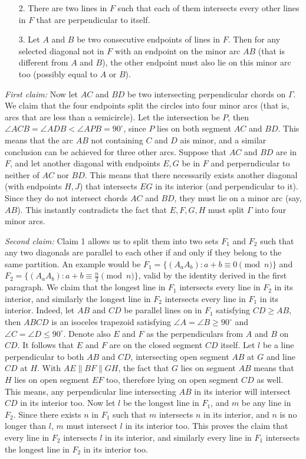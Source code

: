 \documentclass[11pt,a4paper]{article}
\begin{document}
\begin{itemize}
\begin{itemize}
\item [2.]
There are two lines in $F$ such that each of them intersects every other lines in $F$ that are perpendicular to itself.

\item [3.]
Let $A$ and $B$ be two consecutive endpoints of lines in $F$. 
Then for any selected diagonal not in $F$ with an endpoint on the minor arc $AB$ (that is different from $A$ and $B$), the other endpoint must also lie on this minor arc too (possibly equal to $A$ or $B$).

\end{itemize}
\emph{First claim:}
Now let $AC$ and $BD$ be two intersecting perpendicular chords on $\Gamma$. We claim that the four endpoints split the circles into four minor arcs (that is, arcs that are less than a semicircle). 
Let the intersection be $P$, then $\angle ACB=\angle ADB<\angle APB=90^{\circ}$, since $P$ lies on both segment $AC$ and $BD$. 
This means that the arc $AB$ not containing $C$ and $D$ ais minor, and a similar conclusion can be achieved for three other arcs. 
Suppose that $AC$ and $BD$ are in $F$, and let another diagonal with endpoints $E, G$ be in $F$ and perperndicular to neither of $AC$ nor $BD$. 
This means that there necessarily exists another diagonal (with endpoints $H, J$) that intersects $EG$ in its interior (and perpendicular to it). 
Since they do not intersect chords $AC$ and $BD$, they must lie on a minor arc (say, $AB$). 
This instantly contradicts the fact that $E, F, G, H$ must split $\Gamma$ into four minor arcs. 

\emph{Second claim:}
Claim 1 allows us to split them into two sets $F_1$ and $F_2$ such that any two diagonals are parallel to each other if and only if they belong to the same partition. 
An example would be $F_1=\{(A_aA_b): a+b\equiv 0\pmod{n}\}$ and $F_2=\{(A_aA_b): a+b\equiv \frac n2\pmod{n}\}$, 
valid by the identity derived in the first paragraph. 
We claim that the longest line in $F_1$ intersects every line in $F_2$ in its interior, and similarly the longest line in $F_2$ intersects every line in $F_1$ in its interior. 
Indeed, let $AB$ and $CD$ be parallel lines on in $F_1$ satisfying $CD\ge AB$, 
then $ABCD$ is an isoceles trapezoid satisfying $\angle A=\angle B\ge 90^{\circ}$ and $\angle C=\angle D\le 90^{\circ}$. 
Denote also $E$ and $F$ as the perpendiculars from $A$ and $B$ on $CD$. It follows that $E$ and $F$ are on the closed segment $CD$ itself. 
Let $l$ be a line perpendicular to both $AB$ and $CD$, intersecting open segment $AB$ at $G$ and line $CD$ at $H$. 
With $AE\parallel BF\parallel GH$, the fact that $G$ lies on segment $AB$ means that $H$ lies on open segment $EF$ too, 
therefore lying on open segment $CD$ as well. 
This means, any perpendicular line intersecting $AB$ in its interior will intersect $CD$ in its interior too. 
Now let $l$ be the longest line in $F_1$, and $m$ be any line in $F_2$. Since there exists $n$ in $F_1$ such that $m$ intersects $n$ in its interior, and $n$ is no longer than $l$, $m$ must intersect $l$ in its interior too. This proves the claim that every line in $F_2$ intersects $l$ in its interior, and similarly every line in $F_1$ intersects the longest line in $F_2$ in its interior too. 


\end{itemize}
\end{document}
